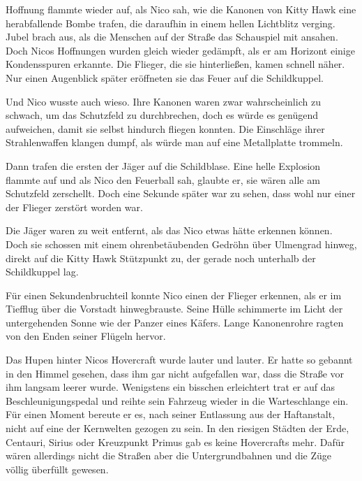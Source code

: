 \par

Hoffnung flammte wieder auf, als Nico sah, wie die Kanonen von Kitty Hawk eine herabfallende Bombe trafen, die daraufhin in einem hellen Lichtblitz verging. Jubel brach aus, als die Menschen auf der Straße das Schauspiel mit ansahen. Doch Nicos Hoffnungen wurden gleich wieder gedämpft, als er am Horizont einige Kondensspuren erkannte. Die Flieger, die sie hinterließen, kamen schnell näher. Nur einen Augenblick später eröffneten sie das Feuer auf die Schildkuppel.

\par

Und Nico wusste auch wieso. Ihre Kanonen waren zwar wahrscheinlich zu schwach, um das Schutzfeld zu durchbrechen, doch es würde es genügend aufweichen, damit sie selbst hindurch fliegen konnten. Die Einschläge ihrer Strahlenwaffen klangen dumpf, als würde man auf eine Metallplatte trommeln.

\par

Dann trafen die ersten der Jäger auf die Schildblase. Eine helle Explosion flammte auf und als Nico den Feuerball sah, glaubte er, sie wären alle am Schutzfeld zerschellt. Doch eine Sekunde später war zu sehen, dass wohl nur einer der Flieger zerstört worden war.

\par

Die Jäger waren zu weit entfernt, als das Nico etwas hätte erkennen können. Doch sie schossen mit einem ohrenbetäubenden Gedröhn über Ulmengrad hinweg, direkt auf die Kitty Hawk Stützpunkt zu, der gerade noch unterhalb der Schildkuppel lag.

\par

Für einen Sekundenbruchteil konnte Nico einen der Flieger erkennen, als er im Tiefflug über die Vorstadt hinwegbrauste. Seine Hülle schimmerte im Licht der untergehenden Sonne wie der Panzer eines Käfers. Lange Kanonenrohre ragten von den Enden seiner Flügeln hervor.

\par

Das Hupen hinter Nicos Hovercraft wurde lauter und lauter. Er hatte so gebannt in den Himmel gesehen, dass ihm gar nicht aufgefallen war, dass die Straße vor ihm langsam leerer wurde. Wenigstens ein bisschen erleichtert trat er auf das Beschleunigungspedal und reihte sein Fahrzeug wieder in die Warteschlange ein. Für einen Moment bereute er es, nach seiner Entlassung aus der Haftanstalt, nicht auf eine der Kernwelten gezogen zu sein. In den riesigen Städten der Erde, Centauri, Sirius oder Kreuzpunkt Primus gab es keine Hovercrafts mehr. Dafür wären allerdings nicht die Straßen aber die Untergrundbahnen und die Züge völlig überfüllt gewesen.

